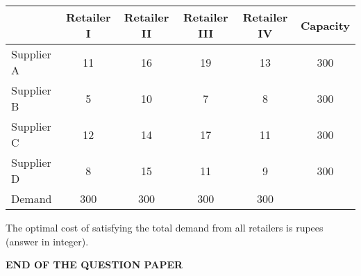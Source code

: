 \documentclass[journal,11pt,onecolumn]{IEEEtran}
\begin{document}
\begin{enumerate}[resume]
          \begin{table}[H]
              \centering
              \begin{tabular}{|l|c|c|c|c|c|}
                  \hline
                             & Retailer I & Retailer II & Retailer III & Retailer IV & Capacity \\
                  \hline
                  Supplier A & 11         & 16          & 19           & 13          & 300      \\
                  \hline
                  Supplier B & 5          & 10          & 7            & 8           & 300      \\
                  \hline
                  Supplier C & 12         & 14          & 17           & 11          & 300      \\
                  \hline
                  Supplier D & 8          & 15          & 11           & 9           & 300      \\
                  \hline
                  Demand     & 300        & 300         & 300          & 300         &          \\
                  \hline
              \end{tabular}
              \caption{}
              \label{t65}
          \end{table}

          The optimal cost of satisfying the total demand from all retailers is \underline{\hspace{2cm}} rupees (answer in integer).

\end{enumerate}

\centering\Large\textbf{END OF THE QUESTION PAPER}
\end{document}
